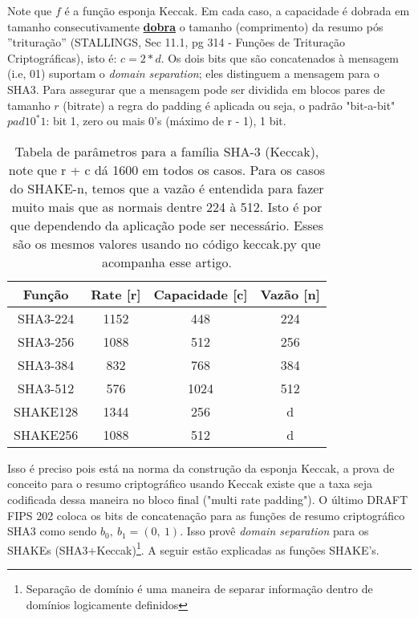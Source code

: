 \documentclass[12pt, a4paper]{article}
\begin{document}
\begin{enumerate}
\begin{enumerate}
\begin{enumerate}
Note que $f$ é a função esponja Keccak. Em cada caso, a capacidade é dobrada em
tamanho consecutivamente \underline{\textbf{dobra}} o tamanho (comprimento) da
resumo pós ''trituração'' (STALLINGS, Sec 11.1, pg 314 - Funções de Trituração
Criptográficas), isto é: $c = 2*d$. Os dois bits que são concatenados à mensagem
(i.e, 01) suportam o \textit{domain separation}; eles distinguem a mensagem para
o SHA3. Para assegurar que a mensagem pode ser dividida em blocos pares de
tamanho $r$ (bitrate) a regra do padding é aplicada ou seja, o padrão
"bit-a-bit" $pad10^{*}1$: bit 1, zero ou mais 0's (máximo de r - 1), 1 bit.\\

\begin{table}[ht!]
  \label{sha3par}
  \centering
  \begin{tabular}{|c|c|c|c|}
    \hline Função & Rate [r] & Capacidade [c] & Vazão [n] \\
    \hline SHA3-224 & 1152 & 448 & 224 \\
    \hline SHA3-256 & 1088 & 512 & 256 \\
    \hline SHA3-384 & 832 & 768 & 384 \\
    \hline SHA3-512 & 576 & 1024 & 512 \\
    \hline SHAKE128 & 1344 & 256 & d \\
    \hline SHAKE256 & 1088 & 512 & d \\
    \hline
  \end{tabular}
  \caption{Tabela de parâmetros para a família SHA-3 (Keccak), note que r + c dá
  1600 em todos os casos. Para os casos do SHAKE-n, temos que a vazão é
  entendida para fazer muito mais que as normais dentre 224 à 512. Isto é por
  que dependendo da aplicação pode ser necessário. Esses são os mesmos valores
  usando no código keccak.py que acompanha esse artigo.}
\end{table}

Isso é preciso pois está na norma da construção da esponja Keccak, a prova de
conceito para o resumo criptográfico usando Keccak existe que a taxa seja
codificada dessa maneira no bloco final ("multi rate padding"). O último DRAFT
FIPS 202 coloca os bits de concatenação para as funções de resumo criptográfico
SHA3 como sendo $b_{0},\ b_{1} = (0,\ 1)$. Isso provê \textit{domain separation}
para os SHAKEs (SHA3+Keccak)\footnote{Separação de domínio é uma maneira de
separar informação dentro de domínios logicamente definidos}. A seguir estão
explicadas as funções SHAKE's.\\


\end{enumerate}
\end{enumerate}
\end{enumerate}
\end{document}
